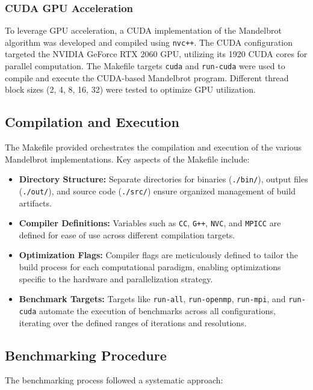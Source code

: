 \documentclass[
	report, %
	11pt, %
]{CSUniSchoolLabReport}
\newcounter{ct}
\begin{document}
\subsubsection{CUDA GPU Acceleration}

To leverage GPU acceleration, a CUDA implementation of the Mandelbrot algorithm was developed and compiled using \texttt{nvc++}. The CUDA configuration targeted the NVIDIA GeForce RTX 2060 GPU, utilizing its 1920 CUDA cores for parallel computation. The Makefile targets \texttt{cuda} and \texttt{run-cuda} were used to compile and execute the CUDA-based Mandelbrot program. Different thread block sizes (2, 4, 8, 16, 32) were tested to optimize GPU utilization.

\subsection{Compilation and Execution}

The Makefile provided orchestrates the compilation and execution of the various Mandelbrot implementations. Key aspects of the Makefile include:

\begin{itemize}
	\item \textbf{Directory Structure:} Separate directories for binaries (\texttt{./bin/}), output files (\texttt{./out/}), and source code (\texttt{./src/}) ensure organized management of build artifacts.
	\item \textbf{Compiler Definitions:} Variables such as \texttt{CC}, \texttt{G++}, \texttt{NVC}, and \texttt{MPICC} are defined for ease of use across different compilation targets.
	\item \textbf{Optimization Flags:} Compiler flags are meticulously defined to tailor the build process for each computational paradigm, enabling optimizations specific to the hardware and parallelization strategy.
	\item \textbf{Benchmark Targets:} Targets like \texttt{run-all}, \texttt{run-openmp}, \texttt{run-mpi}, and \texttt{run-cuda} automate the execution of benchmarks across all configurations, iterating over the defined ranges of iterations and resolutions.
\end{itemize}

\subsection{Benchmarking Procedure}

The benchmarking process followed a systematic approach:
\end{document}
